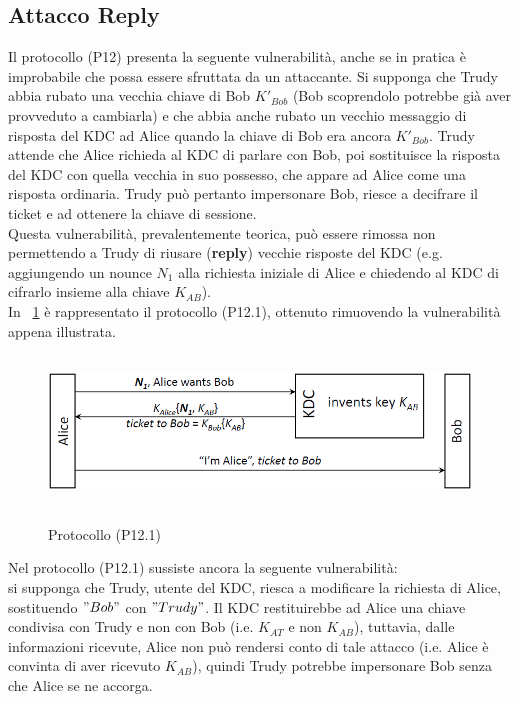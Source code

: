 \subsection{Attacco Reply}
Il protocollo (P12) presenta la seguente vulnerabilità, anche se in pratica è improbabile che possa essere sfruttata da un attaccante. Si supponga che Trudy abbia rubato una vecchia chiave di Bob $K'_{Bob}$ (Bob scoprendolo potrebbe già aver provveduto a cambiarla) e che abbia anche rubato un vecchio messaggio di risposta del KDC ad Alice quando la chiave di Bob era ancora $K'_{Bob}$. Trudy attende che Alice richieda al KDC di parlare con Bob, poi sostituisce la risposta del KDC con quella vecchia in suo possesso, che appare ad Alice come una risposta ordinaria. Trudy può pertanto impersonare Bob, riesce a decifrare il ticket e ad ottenere la chiave di sessione.\\
Questa vulnerabilità, prevalentemente teorica, può essere rimossa non permettendo a Trudy di riusare (\textbf{reply}) vecchie risposte del KDC (e.g. aggiungendo un nounce $N_{1}$ alla richiesta iniziale di Alice e chiedendo al KDC di cifrarlo insieme alla chiave $K_{AB}$).\\
In \figurename~\ref{fig:ImgS103bis} è rappresentato il protocollo (P12.1), ottenuto rimuovendo la vulnerabilità appena illustrata.
\begin{figure}[htbp]
	\centering%
	\subfigure%
	{\includegraphics[height=4cm, width=12cm, keepaspectratio]{Immagini/autenticazione/ImgS103bis.png}}
	\caption{Protocollo (P12.1)}\label{fig:ImgS103bis} 	
\end{figure}
Nel protocollo (P12.1) sussiste ancora la seguente vulnerabilità:\\
si supponga che Trudy, utente del KDC, riesca a modificare la richiesta di Alice, sostituendo $"Bob"$ con $"Trudy"$. Il KDC restituirebbe ad Alice una chiave condivisa con Trudy e non con Bob (i.e. $K_{AT}$ e non $K_{AB}$), tuttavia, dalle informazioni ricevute, Alice non può rendersi conto di tale attacco (i.e. Alice è convinta di aver ricevuto $K_{AB}$), quindi Trudy potrebbe impersonare Bob senza che Alice se ne accorga.\\ \\
